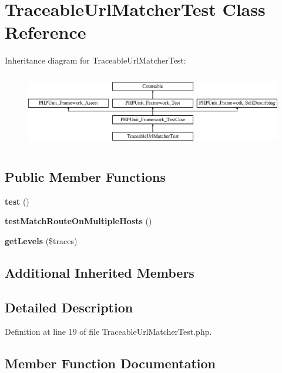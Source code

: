 \section{Traceable\+Url\+Matcher\+Test Class Reference}
\label{class_symfony_1_1_component_1_1_routing_1_1_tests_1_1_matcher_1_1_traceable_url_matcher_test}
Inheritance diagram for Traceable\+Url\+Matcher\+Test\+:\begin{figure}[H]
\begin{center}
\leavevmode
\includegraphics[height=3.303835cm]{class_symfony_1_1_component_1_1_routing_1_1_tests_1_1_matcher_1_1_traceable_url_matcher_test}
\end{center}
\end{figure}
\subsection*{Public Member Functions}
\begin{DoxyCompactItemize}
\item 
{\bf test} ()
\item 
{\bf test\+Match\+Route\+On\+Multiple\+Hosts} ()
\item 
{\bf get\+Levels} (\$traces)
\end{DoxyCompactItemize}
\subsection*{Additional Inherited Members}


\subsection{Detailed Description}


Definition at line 19 of file Traceable\+Url\+Matcher\+Test.\+php.



\subsection{Member Function Documentation}
